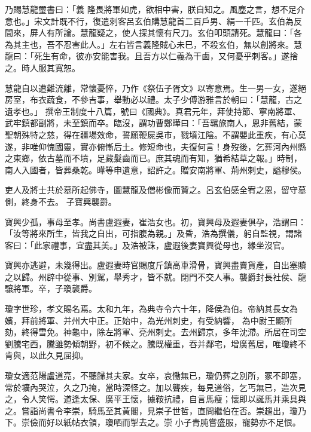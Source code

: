 \begin{pinyinscope}
 乃賜慧龍璽書曰：「義
 隆畏將軍如虎，欲相中害，朕自知之。風塵之言，想不足介意也。」宋文計既不行，復遣刺客呂玄伯購慧龍首二百戶男、絹一千匹。玄伯為反間來，屏人有所論。慧龍疑之，使人探其懷有尺刀。玄伯叩頭請死。慧龍曰：「各為其主也，吾不忍害此人。」左右皆言義隆賊心未巳，不殺玄伯，無以創將來。慧龍曰：「死生有命，彼亦安能害我。且吾方以仁義為干鹵，又何憂乎刺客。」遂捨之。時人服其寬恕。



 慧龍自以遭難流離，常懷憂悴，乃作《祭伍子胥文》以寄意焉。生一男一女，遂絕房室，布衣蔬食，不參吉事，舉動必以禮。太子少傅游雅言於朝曰：「慧龍，古之遺孝也。」
 撰帝王制度十八篇，號曰《國典》。真君元年，拜使持節、寧南將軍、武牢鎮都副將，未至鎮而卒。臨沒，謂功曹鄭曄曰：「吾羈旅南人，恩非舊結，蒙聖朝殊特之慈，得在疆場效命，誓願鞭屍吳市，戮墳江陰。不謂嬰此重疾，有心莫遂，非唯仰愧國靈，實亦俯慚后土。修短命也，夫復何言！身歿後，乞葬河內州縣之東鄉，依古墓而不墳，足藏髮齒而已。庶其魂而有知，猶希結草之報。」時制，南人入國者，皆葬桑乾。曄等申遺意，詔許之。贈安南將軍、荊州刺史，謚穆侯。



 吏人及將士共於墓所起佛寺，圖慧龍及僧彬像而贊之。呂玄伯感全宥之恩，留守墓側，終身不去。
 子寶興襲爵。



 寶興少孤，事母至孝。尚書盧遐妻，崔浩女也。初，寶興母及遐妻俱孕，浩謂曰：「汝等將來所生，皆我之自出，可指腹為親。」及昏，浩為撰儀，躬自監視，謂諸客曰：「此家禮事，宜盡其美。」及浩被誅，盧遐後妻寶興從母也，緣坐沒官。



 寶興亦逃避，未幾得出。盧遐妻時官賜度斤鎮高車滑骨，寶興盡賣貨產，自出塞贖之以歸。州辟中從事、別駕，舉秀才，皆不就。閉門不交人事。襲爵封長社侯、龍驤將軍。卒，子瓊襲爵。



 瓊字世珍，孝文賜名焉。太和九年，為典寺令六十年，降侯為伯。帝納其長女為嬪，拜前將軍、并州大中正。正始中，為光州刺史，有受納響，
 為中尉王顯所劾，終得雪免。神龜中，除左將軍、兗州刺史。去州歸京，多年沈滯。所居在司空劉騰宅西，騰雖勢傾朝野，初不候之。騰既權重，吞并鄰宅，增廣舊居，唯瓊終不肯與，以此久見屈抑。



 瓊女適范陽盧道亮，不聽歸其夫家。女卒，哀慟無已，瓊仍葬之別所，冢不即塞，常於壙內哭泣，久之乃掩，當時深怪之。加以聾疾，每見道俗，乞丐無已，造次見之，令人笑愕。道逢太保、廣平王懷，據鞍抗禮，自言馬瘦；懷即以誕馬并乘具與之。嘗詣尚書令李崇，騎馬至其黃閣，見崇子世哲，直問繼伯在否。崇趨出，瓊乃下。崇儉而好以紙帖衣領，瓊哂而掣去之。崇
 小子青肫嘗盛服，寵勢亦不足恨。




\end{pinyinscope}
